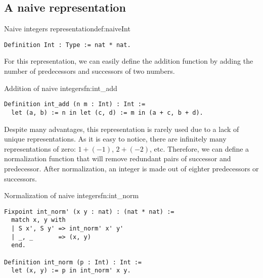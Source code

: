 \subsection{A naive representation}
\begin{defi}{Naive integers representation}{def:naiveInt}
\begin{verbatim}
Definition Int : Type := nat * nat.
\end{verbatim}
\end{defi}
For this representation, we can easily define the addition function by adding the number of predecessors and successors of two numbers.
\begin{func}{Addition of naive integers}{fn:int_add}
\begin{verbatim}
Definition int_add (n m : Int) : Int :=
  let (a, b) := n in let (c, d) := m in (a + c, b + d).
\end{verbatim}
\end{func}
Despite many advantages, this representation is rarely used due to a lack of unique representations. As it is easy to notice, there are infinitely many representations of zero: $1 + (-1)$, $2 + (-2)$, etc. Therefore, we can define a normalization function that will remove redundant pairs of successor and predecessor. After normalization, an integer is made out of eighter predecessors or successors.
\begin{func}{Normalization of naive integers}{fn:int_norm}
\begin{verbatim}
Fixpoint int_norm' (x y : nat) : (nat * nat) :=
  match x, y with
  | S x', S y' => int_norm' x' y'
  | _, _       => (x, y)
  end.

Definition int_norm (p : Int) : Int := 
  let (x, y) := p in int_norm' x y.
\end{verbatim}
\end{func}
